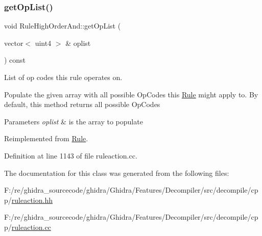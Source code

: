 \subsubsection{\texorpdfstring{getOpList()}{getOpList()}}
{\footnotesize\ttfamily void Rule\+High\+Order\+And\+::get\+Op\+List (\begin{DoxyParamCaption}\item[{vector$<$ uint4 $>$ \&}]{oplist }\end{DoxyParamCaption}) const\hspace{0.3cm}{\ttfamily [virtual]}}



List of op codes this rule operates on. 

Populate the given array with all possible Op\+Codes this \mbox{\hyperlink{class_rule}{Rule}} might apply to. By default, this method returns all possible Op\+Codes 
\begin{DoxyParams}{Parameters}
{\em oplist} & is the array to populate \\
\hline
\end{DoxyParams}


Reimplemented from \mbox{\hyperlink{class_rule_a4023bfc7825de0ab866790551856d10e}{Rule}}.



Definition at line 1143 of file ruleaction.\+cc.



The documentation for this class was generated from the following files\+:\begin{DoxyCompactItemize}
\item 
F\+:/re/ghidra\+\_\+sourcecode/ghidra/\+Ghidra/\+Features/\+Decompiler/src/decompile/cpp/\mbox{\hyperlink{ruleaction_8hh}{ruleaction.\+hh}}\item 
F\+:/re/ghidra\+\_\+sourcecode/ghidra/\+Ghidra/\+Features/\+Decompiler/src/decompile/cpp/\mbox{\hyperlink{ruleaction_8cc}{ruleaction.\+cc}}\end{DoxyCompactItemize}
